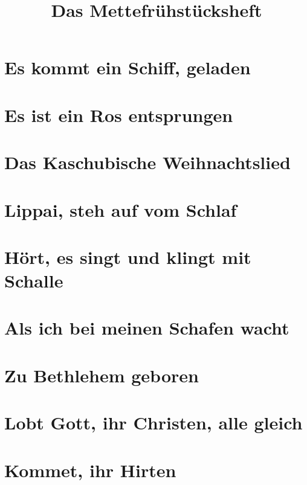 \documentclass[11pt]{article}
\title{Das Mettefrühstücksheft}
\begin{document}
\maketitle
\newpage
\begin{multicols}{2}
\tableofcontents
\end{multicols}
\pagestyle{empty}
\section{Es kommt ein Schiff, geladen}

\section{Es ist ein Ros entsprungen}

\section{Das Kaschubische Weihnachtslied}

\section{Lippai, steh auf vom Schlaf}

\section{Hört, es singt und klingt mit Schalle}

\section{Als ich bei meinen Schafen wacht}

\section{Zu Bethlehem geboren}

\section{Lobt Gott, ihr Christen, alle gleich}

\section{Kommet, ihr Hirten}
\end{document}
